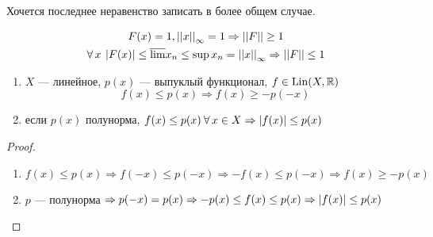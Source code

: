 \documentclass[document]{subfiles}
\begin{document}
Хочется последнее неравенство записать в более общем случае.


\begin{gather*}
    F(x) = 1, \norm{x}_\infty = 1 \Rightarrow \norm{F} \geq 1 \\
    \forall x \: \abs{F(x)} \leq \overline{\liml} x_n \leq \sup x_n = \norm{x}_\infty \Rightarrow \norm{F} \leq 1
    \end{gather*}
\begin{statement}
    \begin{enumerate}       
        \item $X$ --- линейное, $p(x)$ --- выпуклый функционал, $f \in \operatorname{Lin}(X, \mathbb{R})$
        \[ f(x) \leq p(x) \Rightarrow f(x) \geq -p(-x) \] 
        \item если $p(x)$ полунорма, $f(x) \leq p(x) \: \forall x \in X \Rightarrow \abs{f(x)} \leq p(x)$
    \end{enumerate}
\end{statement}

\begin{proof}
    \begin{enumerate}
        \item $f(x) \leq p(x) \Rightarrow f(-x) \leq p(-x) \Rightarrow -f(x) \leq p(-x) \Rightarrow f(x) \geq -p(x) $
        \item $p$ --- полунорма $\Rightarrow p(-x) = p(x) \Rightarrow -p(x) \leq f(x) \leq p(x) \Rightarrow \left| {f(x)} \right| \leq p(x)$
    \end{enumerate}
\end{proof}
\end{document}
